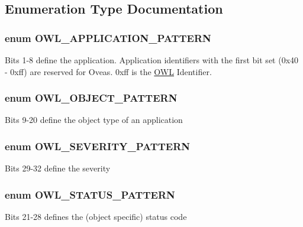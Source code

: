 \subsection{Enumeration Type Documentation}
\subsubsection[{OWL\_\-APPLICATION\_\-PATTERN}]{\setlength{\rightskip}{0pt plus 5cm}enum {\bf OWL\_\-APPLICATION\_\-PATTERN}}\label{class_8register_8php_a22359c406b8745e8fa2412ec96d5e74c}
Bits 1-\/8 define the application. Application identifiers with the first bit set (0x40 -\/ 0xff) are reserved for Oveas. 0xff is the \hyperlink{classOWL}{OWL} Identifier. 
\subsubsection[{OWL\_\-OBJECT\_\-PATTERN}]{\setlength{\rightskip}{0pt plus 5cm}enum {\bf OWL\_\-OBJECT\_\-PATTERN}}\label{class_8register_8php_aac5ed52fb1bbffdff69e9a24c40962f5}
Bits 9-\/20 define the object type of an application 
\subsubsection[{OWL\_\-SEVERITY\_\-PATTERN}]{\setlength{\rightskip}{0pt plus 5cm}enum {\bf OWL\_\-SEVERITY\_\-PATTERN}}\label{class_8register_8php_aeb9363fcaa1cd911762ff88518a9d973}
Bits 29-\/32 define the severity 
\subsubsection[{OWL\_\-STATUS\_\-PATTERN}]{\setlength{\rightskip}{0pt plus 5cm}enum {\bf OWL\_\-STATUS\_\-PATTERN}}\label{class_8register_8php_a0a8649e9ad7fa654df2c41aa4ba1283c}
Bits 21-\/28 defines the (object specific) status code 